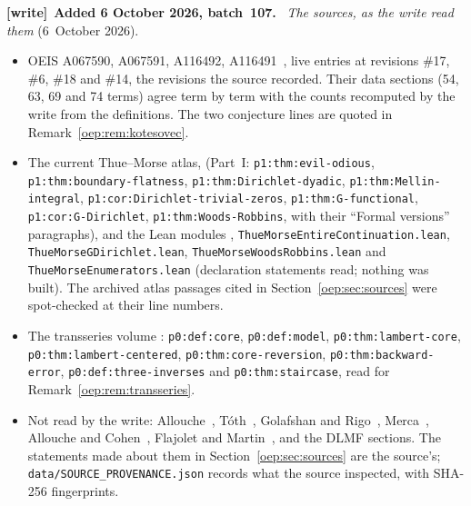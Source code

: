 \documentclass[11pt,letterpaper]{article}
\theoremstyle{remark}\newtheorem{remark}[theorem]{Remark}
\newcommand{\file}[1]{\nolinkurl{#1}}
\newenvironment{writenote}[1][]{\par\smallskip\begingroup\small
 \noindent\textbf{[write]}\if\relax\detokenize{#1}\relax\else~\textbf{#1.}\fi\ }%
 {\par\endgroup\smallskip}
\begin{document}
\begin{writenote}[Added 6 October 2026, batch~107]
\emph{The sources, as the write read them} (6~October 2026).
\begin{itemize}\raggedright
\item OEIS A067590, A067591, A116492, A116491~\cite{oeis067590,oeis067591,oeis116492,oeis116491},
 live entries at revisions \#17, \#6, \#18 and \#14, the revisions the
 source recorded. Their data sections (54, 63, 69 and 74 terms) agree term
 by term with the counts recomputed by the write from the definitions. The
 two conjecture lines are quoted in Remark~\ref{oep:rem:kotesovec}.
\item The current Thue--Morse atlas,
 (Part~I: \file{p1:thm:evil-odious}, \file{p1:thm:boundary-flatness},
 \file{p1:thm:Dirichlet-dyadic}, \file{p1:thm:Mellin-integral},
 \file{p1:cor:Dirichlet-trivial-zeros}, \file{p1:thm:G-functional},
 \file{p1:cor:G-Dirichlet}, \file{p1:thm:Woods-Robbins}, with their
 ``Formal versions'' paragraphs), and the Lean modules
 ,
 \file{ThueMorseEntireContinuation.lean}, \file{ThueMorseGDirichlet.lean},
 \file{ThueMorseWoodsRobbins.lean} and \file{ThueMorseEnumerators.lean}
 (declaration statements read; nothing was built). The archived atlas
 passages cited in Section~\ref{oep:sec:sources} were spot-checked at their
 line numbers.
\item The transseries volume
 :
 \file{p0:def:core}, \file{p0:def:model}, \file{p0:thm:lambert-core},
 \file{p0:thm:lambert-centered}, \file{p0:thm:core-reversion},
 \file{p0:thm:backward-error}, \file{p0:def:three-inverses} and
 \file{p0:thm:staircase}, read for Remark~\ref{oep:rem:transseries}.
\item Not read by the write: Allouche~\cite{allouche2019,allouche2015},
 T\'oth~\cite{toth}, Golafshan and Rigo~\cite{golafshan},
 Merca~\cite{merca}, Allouche and Cohen~\cite{allouchecohen}, Flajolet and
 Martin~\cite{flajoletmartin}, and the DLMF sections. The statements made
 about them in Section~\ref{oep:sec:sources} are the source's;
 \file{data/SOURCE_PROVENANCE.json} records what the source inspected, with
 SHA-256 fingerprints.
\end{itemize}


\end{writenote}
\end{document}
